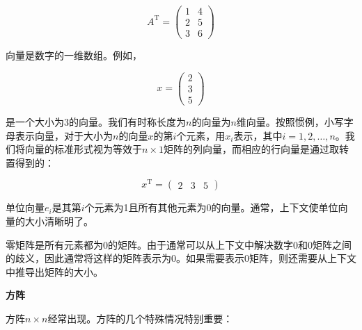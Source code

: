 \documentclass[lang=cn,newtx,10pt,scheme=chinese]{elegantbook}
\begin{document}
$$
A^{\mathrm{T}}=(\begin{array}{ll}
1 & 4 \\
2 & 5 \\
3 & 6
\end{array})
$$

向量是数字的一维数组。例如，

$$
x=(\begin{array}{l}
2 \\
3 \\
5
\end{array})
$$

是一个大小为3的向量。我们有时称长度为$n$的向量为$n$维向量。按照惯例，小写字母表示向量，对于大小为$n$的向量$x$的第$i$个元素，用$x_i$表示，其中$i=1,2,\ldots,n$。我们将向量的标准形式视为等效于$n \times 1$矩阵的列向量，而相应的行向量是通过取转置得到的：

$$
x^{\mathrm{T}}=(\begin{array}{lll}
2 & 3 & 5
\end{array})
$$

单位向量$e_i$是其第$i$个元素为1且所有其他元素为0的向量。通常，上下文使单位向量的大小清晰明了。

零矩阵是所有元素都为0的矩阵。由于通常可以从上下文中解决数字0和0矩阵之间的歧义，因此通常将这样的矩阵表示为0。如果需要表示0矩阵，则还需要从上下文中推导出矩阵的大小。

\textbf{方阵}

方阵$n \times n$经常出现。方阵的几个特殊情况特别重要：
\end{document}
